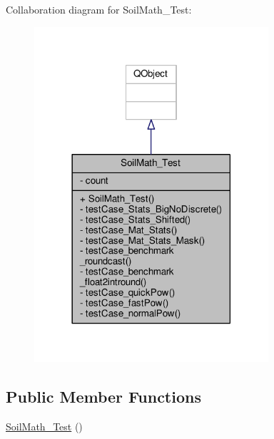 Collaboration diagram for Soil\+Math\+\_\+\+Test\+:\nopagebreak
\begin{figure}[H]
\begin{center}
\leavevmode
\includegraphics[width=246pt]{class_soil_math___test__coll__graph}
\end{center}
\end{figure}
\subsection*{Public Member Functions}
\begin{DoxyCompactItemize}
\item 
\hyperlink{class_soil_math___test_a3a7ea7f0348fc0297539b2b2e61ce289}{Soil\+Math\+\_\+\+Test} ()
\end{DoxyCompactItemize}
